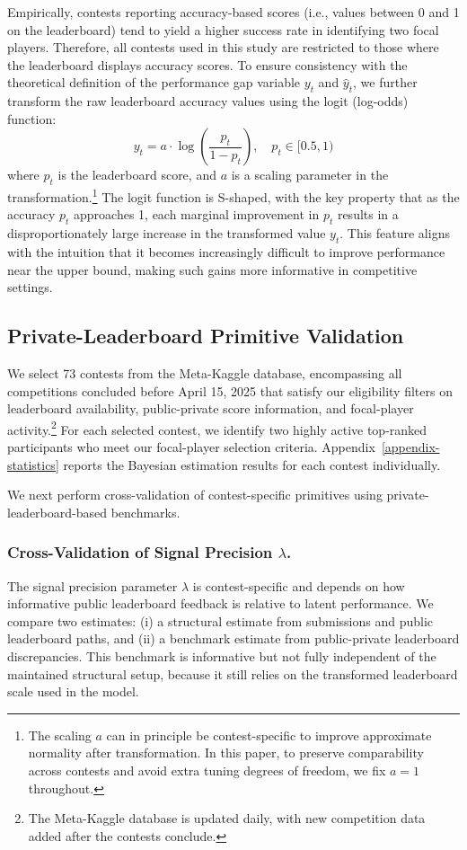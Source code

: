 \documentclass[mnsc]{informs3}
\begin{document}
Empirically, contests reporting accuracy-based scores (i.e., values between 0 and 1 on the leaderboard) tend to yield a higher success rate in identifying two focal players.
Therefore, all contests used in this study are restricted to those where the leaderboard displays accuracy scores.
To ensure consistency with the theoretical definition of the performance gap variable $y_t$ and $\hat{y}_t$, we further transform the raw leaderboard accuracy values using the logit (log-odds) function:
\begin{equation}\label{eq-leaderboard-transform}
y_t = a \cdot \log\left(\frac{p_t}{1-p_t}\right), \quad p_t\in[0.5, 1)
\end{equation}
where $p_t$ is the leaderboard score, and $a$ is a scaling parameter in the transformation.\footnote{
The scaling $a$ can in principle be contest-specific to improve approximate normality after transformation.
In this paper, to preserve comparability across contests and avoid extra tuning degrees of freedom, we fix $a=1$ throughout.
}
The logit function is S-shaped, with the key property that as the accuracy $p_t$ approaches 1, each marginal improvement in $p_t$ results in a disproportionately large increase in the transformed value $y_t$.
This feature aligns with the intuition that it becomes increasingly difficult to improve performance near the upper bound, making such gains more informative in competitive settings.


\subsection{Private-Leaderboard Primitive Validation}\label{sect-validation}


We select 73 contests from the Meta-Kaggle database, encompassing all competitions concluded before April 15, 2025 that satisfy our eligibility filters on leaderboard availability, public-private score information, and focal-player activity.\footnote{
The Meta-Kaggle database is updated daily, with new competition data added after the contests conclude.
}
For each selected contest, we identify two highly active top-ranked participants who meet our focal-player selection criteria.
Appendix~\ref{appendix-statistics} reports the Bayesian estimation results for each contest individually.

We next perform cross-validation of contest-specific primitives using private-leaderboard-based benchmarks.

\subsubsection{Cross-Validation of Signal Precision $\lambda$.}
The signal precision parameter $\lambda$ is contest-specific and depends on how informative public leaderboard feedback is relative to latent performance.
We compare two estimates: (i) a structural estimate from submissions and public leaderboard paths, and (ii) a benchmark estimate from public-private leaderboard discrepancies.
This benchmark is informative but not fully independent of the maintained structural setup, because it still relies on the transformed leaderboard scale used in the model.
\end{document}
